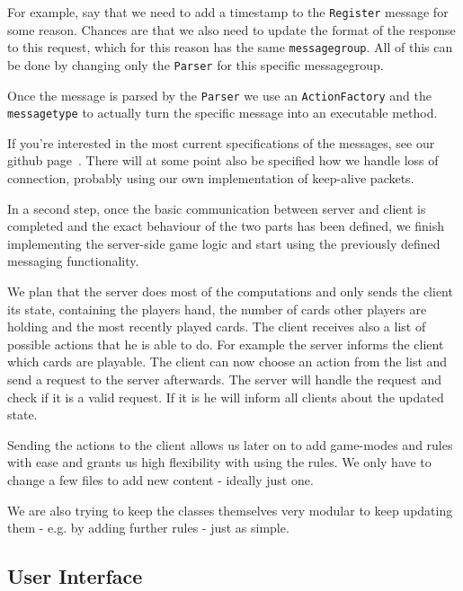 \documentclass{sig-alternate}
\begin{document}
For example, say that we need to add a timestamp to the \verb|Register| message for some reason. Chances are that we also need to update the format of the response to this request, which for this reason has the same \verb|messagegroup|. All of this can be done by changing only the \verb|Parser| for this specific messagegroup.

Once the message is parsed by the \verb|Parser| we use an \verb|ActionFactory| and the \verb|messagetype| to actually turn the specific message into an executable method.

If you're interested in the most current specifications of the messages, see our github page~\cite{github}. There will at some point also be specified how we handle loss of connection, probably using our own implementation of keep-alive packets.

In a second step, once the basic communication between server and client is completed and the exact behaviour of the two parts has been defined, we finish implementing the server-side game logic and start using the previously defined messaging functionality.

We plan that the server does most of the computations and only sends the client its state, containing the players hand, the number of cards other players are holding and the most recently played cards. The client receives also a list of possible actions that he is able to do. For example the server informs the client which cards are playable. The client can now choose an action from the list and send a request to the server afterwards. The server will handle the request and check if it is a valid request. If it is he will inform all clients about the updated state.

Sending the actions to the client allows us later on to add game-modes and rules with ease and grants us high flexibility with using the rules. We only have to change a few files to add new content - ideally just one.

We are also trying to keep the classes themselves very modular to keep updating them - e.g. by adding further rules - just as simple.

\subsection{User Interface}
\end{document}
